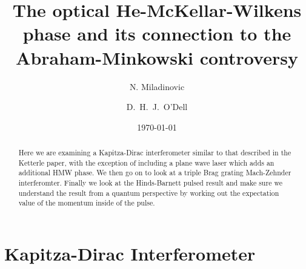 \documentclass[twocolumn,english,pra,aps,superscriptaddress,floatfix]{revtex4-1}
\begin{document}
\author{N. Miladinovic}
\author{D.\ H.\ J.\ O'Dell}

\title{The optical He-McKellar-Wilkens phase and its connection to the Abraham-Minkowski controversy}
\date{\today}

\begin{abstract}
\label{sec:abstract}
Here we are examining a Kapitza-Dirac interferometer similar to that described in the Ketterle paper, with the exception of including a plane wave laser which adds an additional HMW phase.  We then go on to look at a triple Brag grating Mach-Zehnder interferomter. Finally we look at the Hinds-Barnett pulsed result and make sure we understand the result from a quantum perspective by working out the expectation value of the momentum inside of the pulse.
\end{abstract}

\maketitle

\section{Kapitza-Dirac Interferometer}
\label{sec:kaptiza}
\end{document}
